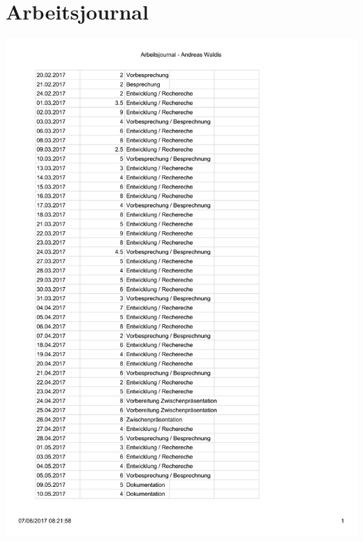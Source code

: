 \section{Arbeitsjournal}
\label{arbeitsjournal}

\includegraphics[page=1,scale=0.8]{bilder/Arbeitsjournal.pdf}
